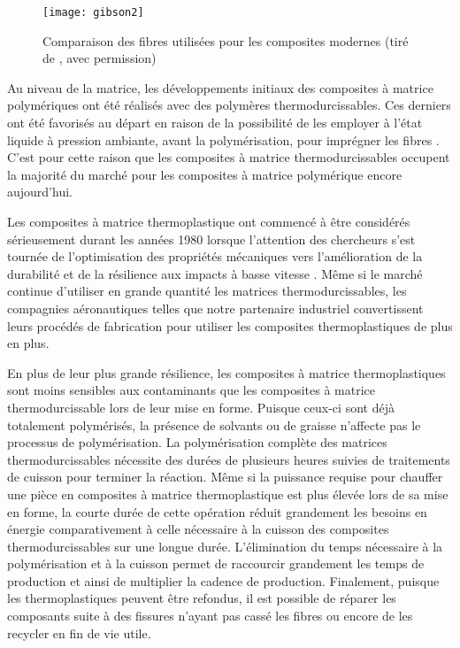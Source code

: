 \begin{figure}
	\centering
	\texttt{[image: gibson2]}
	\caption{Comparaison des fibres utilisées pour les composites modernes (tiré de \cite{Gibson2011}, avec permission)}
	\label{gibson2}
\end{figure}

Au niveau de la matrice, les développements initiaux des composites à matrice polymériques ont été réalisés avec des polymères thermodurcissables. 
Ces derniers ont été favorisés au départ en raison de la possibilité de les employer à l'état liquide à pression ambiante, avant la polymérisation, pour imprégner les fibres \cite{Chatain2015}. 
C'est pour cette raison que les composites à matrice thermodurcissables occupent la majorité du marché pour les composites à matrice polymérique encore aujourd'hui. 

Les composites à matrice thermoplastique ont commencé à être considérés sérieusement durant les années 1980 lorsque l'attention des chercheurs s'est tournée de l'optimisation des propriétés mécaniques vers l'amélioration de la durabilité et de la résilience aux impacts à basse vitesse \cite{asmhandbook21}. 
Même si le marché continue d'utiliser en grande quantité les matrices thermodurcissables, les compagnies aéronautiques telles que notre partenaire industriel convertissent leurs procédés de fabrication pour utiliser les composites thermoplastiques de plus en plus. 

En plus de leur plus grande résilience, les composites à matrice thermoplastiques sont moins sensibles aux contaminants que les composites à matrice thermodurcissable lors de leur mise en forme. 
Puisque ceux-ci sont déjà totalement polymérisés, la présence de solvants ou de graisse n'affecte pas le processus de polymérisation. 
La polymérisation complète des matrices thermodurcissables nécessite des durées de plusieurs heures suivies de traitements de cuisson pour terminer la réaction. 
Même si la puissance requise pour chauffer une pièce en composites à matrice thermoplastique est plus élevée lors de sa mise en forme, la courte durée de cette opération réduit grandement les besoins en énergie comparativement à celle nécessaire à la cuisson des composites thermodurcissables sur une longue durée. 
L'élimination du temps nécessaire à la polymérisation et à la cuisson permet de raccourcir grandement les temps de production et ainsi de multiplier la cadence de production. 
Finalement, puisque les thermoplastiques peuvent être refondus, il est possible de réparer les composants suite à des fissures n'ayant pas cassé les fibres ou encore de les recycler en fin de vie utile. 

